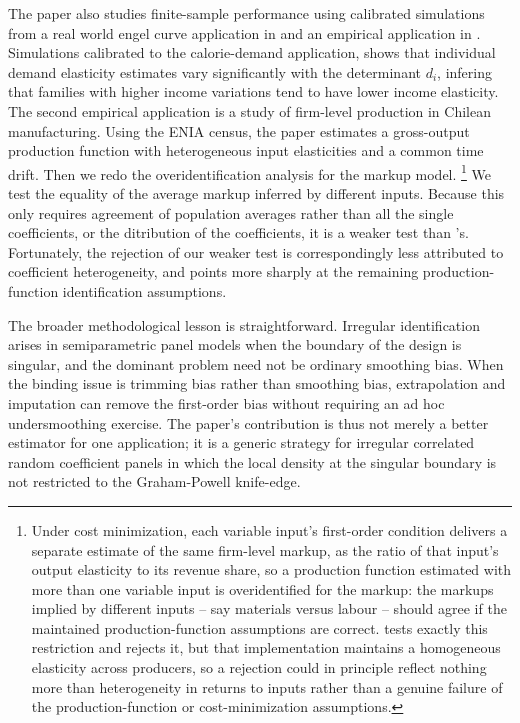 \documentclass{article}
\begin{document}
The paper also studies finite-sample performance using calibrated simulations from a real world engel curve application in \cite{grahampowell} and an empirical application in \cite{Raval2023}. Simulations calibrated to the calorie-demand application, shows that individual demand elasticity estimates vary significantly with the determinant $d_i$, infering that families with higher income variations tend to have lower income elasticity.  The second empirical application is a study of firm-level production in Chilean manufacturing. Using the ENIA census, the paper estimates a gross-output production function with heterogeneous input elasticities and a common time drift. Then we redo the overidentification analysis for the markup model. \footnote{Under cost minimization, each variable input's first-order condition delivers a separate estimate of the same firm-level markup, as the ratio of that input's output elasticity to its revenue share, so a production function estimated with more than one variable input is overidentified for the markup: the markups implied by different inputs -- say materials versus labour -- should agree if the maintained production-function assumptions are correct. \cite{Raval2023} tests exactly this restriction and rejects it, but that implementation maintains a homogeneous elasticity across producers, so a rejection could in principle reflect nothing more than heterogeneity in returns to inputs rather than a genuine failure of the production-function or cost-minimization assumptions.} We test the equality of the average markup inferred by different inputs. Because this only requires agreement of population averages rather than all the single coefficients, or the ditribution of the coefficients, it is a weaker test than \cite{Raval2023}'s. Fortunately, the rejection of our weaker test is correspondingly less attributed to coefficient heterogeneity, and points more sharply at the remaining production-function identification assumptions. 

The broader methodological lesson is straightforward. Irregular identification arises in semiparametric panel models when the boundary of the design is singular, and the dominant problem need not be ordinary smoothing bias. When the binding issue is trimming bias rather than smoothing bias, extrapolation and imputation can remove the first-order bias without requiring an ad hoc undersmoothing exercise. The paper's contribution is thus not merely a better estimator for one application; it is a generic strategy for irregular correlated random coefficient panels in which the local density at the singular boundary is not restricted to the Graham-Powell knife-edge.
\end{document}
